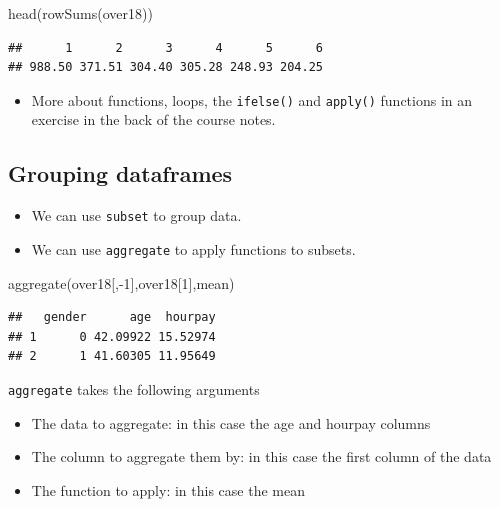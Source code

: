 \documentclass[
]{gitbook}
\newenvironment{Shaded}{\begin{snugshade}}{\end{snugshade}}
\newcommand{\DecValTok}[1]{\textcolor[rgb]{0.00,0.00,0.81}{#1}}
\newcommand{\FunctionTok}[1]{\textcolor[rgb]{0.00,0.00,0.00}{#1}}
\newcommand{\NormalTok}[1]{#1}
\newcommand{\SpecialCharTok}[1]{\textcolor[rgb]{0.00,0.00,0.00}{#1}}
\providecommand{\tightlist}{%
  \setlength{\itemsep}{0pt}\setlength{\parskip}{0pt}}
\begin{document}
\begin{Shaded}
\begin{Highlighting}[]
\FunctionTok{head}\NormalTok{(}\FunctionTok{rowSums}\NormalTok{(over18))}
\end{Highlighting}
\end{Shaded}

\begin{verbatim}
##      1      2      3      4      5      6 
## 988.50 371.51 304.40 305.28 248.93 204.25
\end{verbatim}

\begin{itemize}
\tightlist
\item
  More about functions, loops, the \texttt{ifelse()} and \texttt{apply()} functions in an exercise in the back of the course notes.
\end{itemize}

\hypertarget{grouping-dataframes}{%
\subsection{Grouping dataframes}\label{grouping-dataframes}}

\begin{itemize}
\tightlist
\item
  We can use \texttt{subset} to group data.
\item
  We can use \texttt{aggregate} to apply functions to subsets.
\end{itemize}

\begin{Shaded}
\begin{Highlighting}[]
\FunctionTok{aggregate}\NormalTok{(over18[,}\SpecialCharTok{{-}}\DecValTok{1}\NormalTok{],over18[}\DecValTok{1}\NormalTok{],mean)}
\end{Highlighting}
\end{Shaded}

\begin{verbatim}
##   gender      age  hourpay
## 1      0 42.09922 15.52974
## 2      1 41.60305 11.95649
\end{verbatim}

\texttt{aggregate} takes the following arguments

\begin{itemize}
\tightlist
\item
  The data to aggregate: in this case the age and hourpay columns
\item
  The column to aggregate them by: in this case the first column of the data
\item
  The function to apply: in this case the mean
\end{itemize}
\end{document}
